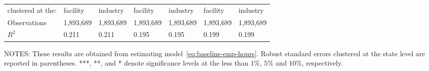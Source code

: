 \begin{table}[H]
{\begin{tabular}{@{}lllllll@{}}
            clustered at the: & facility  & industry  & facility  & industry  & facility  & industry  \\
            Observations      & 1,893,689 & 1,893,689 & 1,893,689 & 1,893,689 & 1,893,689 & 1,893,689 \\
            $R^2$             & 0.211     & 0.211     & 0.195     & 0.195     & 0.199     & 0.199     \\ \bottomrule \bottomrule
        \end{tabular}%
    }
    \begin{minipage}{\columnwidth}
        \vspace{0.05in}
        \tiny NOTES: These results are obtained from estimating model~\ref{eq:baseline-emp-hours}. Robust standard errors clustered at the state level are reported in parentheses. ***, **, and * denote significance levels at the less than $1\%$, $5\%$ and $10\%$, respectively.
    \end{minipage}
\end{table}